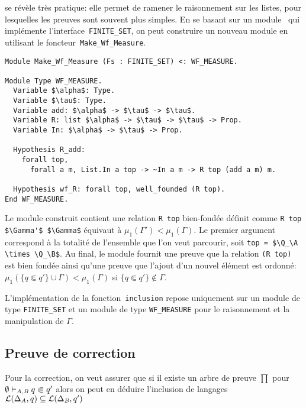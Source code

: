 se révèle très pratique: elle permet de ramener le raisonnement sur les listes, pour lesquelles les preuves
sont souvent plus simples.
En se basant sur un module \coq\ qui implémente l'interface~\lstinline!FINITE_SET!, on peut construire un nouveau module
en utilisant le foncteur~\lstinline!Make_Wf_Measure!.
\begin{lstlisting}
Module Make_Wf_Measure (Fs : FINITE_SET) <: WF_MEASURE.

Module Type WF_MEASURE.
  Variable $\alpha$: Type.
  Variable $\tau$: Type.
  Variable add: $\alpha$ -> $\tau$ -> $\tau$.
  Variable R: list $\alpha$ -> $\tau$ -> $\tau$ -> Prop.
  Variable In: $\alpha$ -> $\tau$ -> Prop.

  Hypothesis R_add:
    forall top,
      forall a m, List.In a top -> ~In a m -> R top (add a m) m.

  Hypothesis wf_R: forall top, well_founded (R top).
End WF_MEASURE.
\end{lstlisting}
Le module construit contient une relation \lstinline!R top! bien-fondée 
définit comme \lstinline!R top $\Gamma'$ $\Gamma$! équivaut à $\mu_1(\Gamma') < \mu_1(\Gamma)$.
Le premier argument correspond à la totalité de l'ensemble que l'on veut parcourir,
soit \lstinline!top = $\Q_\A \times \Q_\B$!. Au final, le module fournit une preuve que la relation 
\lstinline!(R top)! est bien fondée ainsi qu'une preuve que l'ajout d'un nouvel élément 
est ordonné: $\mu_1(\{q \Subset q'\} \cup \Gamma) < \mu_1(\Gamma)$ si $\{q \Subset q'\} \not\in \Gamma$.

L'implémentation de la fonction~\lstinline!inclusion! repose uniquement sur un module de type
\lstinline!FINITE_SET! et un module de type \lstinline!WF_MEASURE! pour le raisonnement et
la manipulation de $\Gamma$.



\subsection{Preuve de correction}
\label{sec:correction}

Pour la correction, on veut assurer que si il existe un arbre de preuve $\prod$
pour $\emptyset \vdash_{\mathit A, \mathit B} q \Subset q'$ alors on peut en déduire l'inclusion de langages
$\mathcal{L}(\Delta_\mathit A, q) \subseteq \mathcal{L}(\Delta_\mathit B, q')$


